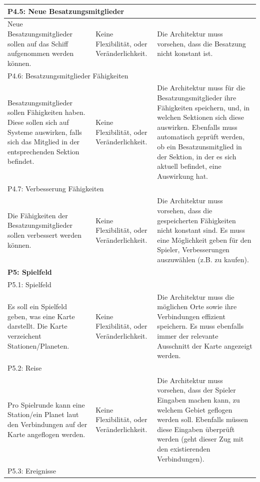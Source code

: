 \documentclass[fontsize=12pt,paper=a4,twoside]{scrartcl}
\begin{document}
\begin{longtable}[c]{|p{5cm}|p{5cm}|p{5cm}|}
\\ \hline
\multicolumn{3}{|l|}{{P4.5: Neue Besatzungsmitglieder}} 
\\ \hline
Neue Besatzungsmitglieder sollen auf das Schiff aufgenommen werden können. & Keine Flexibilität, oder Veränderlichkeit.    &  Die Architektur muss vorsehen, dass die Besatzung nicht konstant ist. 
\\ \hline
\multicolumn{3}{|l|}{{P4.6: Besatzungsmitglieder Fähigkeiten}} 
\\ \hline
Besatzungsmitglieder sollen Fähigkeiten haben. Diese sollen sich auf Systeme auswirken, falls sich das Mitglied in der entsprechenden Sektion befindet. & Keine Flexibilität, oder Veränderlichkeit.    &  Die Architektur muss für die Besatzungsmitglieder ihre Fähigkeiten speichern, und, in welchen Sektionen sich diese auswirken. Ebenfalls muss automatisch geprüft werden, ob ein Besatzunsmitglied in der Sektion, in der es sich aktuell befindet, eine Auswirkung hat. 
\\ \hline
\multicolumn{3}{|l|}{{P4.7: Verbesserung Fähigkeiten}} 
\\ \hline
Die Fähigkeiten der Besatzungsmitglieder sollen verbessert werden können. & Keine Flexibilität, oder Veränderlichkeit.    & Die Architektur muss vorsehen, dass die gespeicherten Fähigkeiten nicht konstant sind. Es muss eine Möglichkeit geben für den Spieler, Verbesserungen auszuwählen (z.B. zu kaufen). 
\\ \hline
%
\multicolumn{3}{|l|}{{\textbf{P5: Spielfeld}}} 
\\ \hline         
\multicolumn{3}{|l|}{{P5.1: Spielfeld}} 
\\ \hline
Es soll ein Spielfeld geben, was eine Karte darstellt. Die Karte verzeichent Stationen/Planeten. & Keine Flexibilität, oder Veränderlichkeit.    & Die Architektur muss die möglichen Orte sowie ihre Verbindungen effizient speichern. Es muss ebenfalls immer der relevante Ausschnitt der Karte angezeigt werden. 
\\ \hline          
\multicolumn{3}{|l|}{{P5.2: Reise}} 
\\ \hline
Pro Spielrunde kann eine Station/ein Planet laut den Verbindungen auf der Karte angeflogen werden.  & Keine Flexibilität, oder Veränderlichkeit.    & Die Architektur muss vorsehen, dass der Spieler Eingaben machen kann, zu welchem Gebiet geflogen werden soll. Ebenfalls müssen diese Eingaben überprüft werden (geht dieser Zug mit den existierenden Verbindungen). 
\\ \hline
\multicolumn{3}{|l|}{{P5.3: Ereignisse}} 

\end{longtable}
\end{document}
